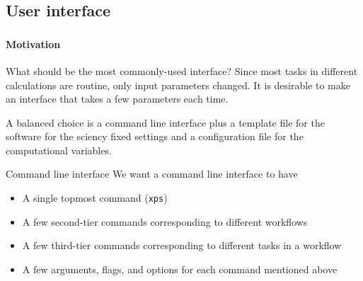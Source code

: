 \subsection{User interface}\label{ssec:ui}

\begin{frame}
    \frametitle{\subsecname}
    \framesubtitle{Motivation}

    \begin{block}{What should be the most commonly-used interface?}
        Since most tasks in different \ab{} calculations are routine, only
        input parameters changed. It is desirable to make an interface that takes a few
        parameters each time.

        A balanced choice is a command line interface
        plus a template file for the \ab{} software for the sciency
        fixed settings and a configuration file for the computational variables.
    \end{block}

    \begin{block}{Command line interface}
        We want a command line interface to have

        \begin{itemize}
            \item A single topmost command (\texttt{xps})
            \item A few second-tier commands corresponding to different workflows
            \item A few third-tier commands corresponding to different tasks in a workflow
            \item A few arguments, flags, and options for each command mentioned above
        \end{itemize}
    \end{block}
\end{frame}

